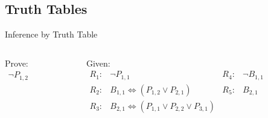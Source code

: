 \documentclass[14pt]{beamer}
\newcommand{\liff}{\Leftrightarrow}
\begin{document}
\subsection{Truth Tables}
\begin{frame}{Inference by Truth Table}
	\small
	\begin{columns}[T]
		\begin{column}{.8in}
			Prove: \\[.2em]
			$
			\begin{array}{l}
				\lnot P_{1,2}
			\end{array}
			$
		\end{column}
		\begin{column}{3.4in}
			Given: \\[.2em]
			\small
			$
			\begin{array}{llll}
			R_1: & \lnot P_{1,1}                                     & R_4: & \lnot B_{1,1} \\
			R_2: & B_{1,1} \liff (P_{1,2} \lor P_{2,1})              & R_5: & B_{2,1}\\
			R_3: & B_{2,1} \liff (P_{1,1} \lor P_{2,2} \lor P_{3,1})
			\end{array}
			$
		\end{column}
	\end{columns}
	\pause
	

\end{frame}
\end{document}
